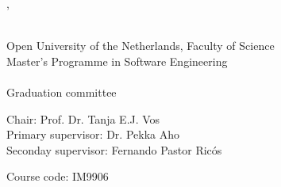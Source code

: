 
\myauthor, \myStudentId\\
\textbf{\mytitle}\\
\myPresentationDate
\vspace*{\fill}

Open University of the Netherlands, Faculty of Science\\
Master's Programme in Software Engineering\\
\\
Graduation committee

Chair: Prof. Dr. Tanja E.J. Vos\\
Primary supervisor: Dr. Pekka Aho\\
Seconday supervisor: Fernando Pastor Ricós

Course code: IM9906
\newpage